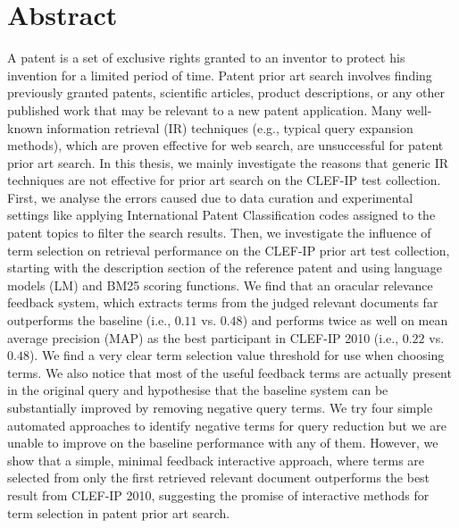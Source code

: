 \chapter*{Abstract}
\vspace{-1em}
A patent is a set of exclusive rights granted to an inventor to protect 
his invention for a limited period of time. Patent prior art search involves 
finding previously granted patents, 
scientific articles, product descriptions, or any other published work 
that may be relevant to a new patent application.
Many well-known information retrieval (IR) techniques (e.g., typical query expansion methods), which are proven effective 
for web search, are unsuccessful for patent 
prior art search.
In this thesis, we mainly investigate the reasons that generic IR techniques are not 
effective for prior art search on the CLEF-IP test collection.   
First, we analyse the errors caused due to data curation and experimental settings 
like applying International Patent Classification codes assigned to the patent topics 
to filter the search results.  
Then, we investigate the influence of term selection on retrieval
performance on the CLEF-IP prior art test collection, starting with
the description section of the reference patent and using language models (LM) and BM25
scoring functions. We find that an oracular relevance feedback system,
which extracts terms from the judged relevant documents far
outperforms the baseline (i.e., $0.11$ vs. $ 0.48 $) and performs twice as well on mean average precision (MAP) as the best
participant in CLEF-IP 2010 (i.e., $0.22$ vs. $ 0.48 $). We find a very clear term selection value
threshold for use when choosing terms.  We also notice that most of
the useful feedback terms are actually present in the original query
and hypothesise that the baseline system can be substantially
improved by removing negative query terms.
We try four simple automated approaches to identify negative terms
for query reduction but we are unable to improve on the baseline
performance with any of them. However, we show that a
simple, minimal feedback interactive approach, where terms are selected
from only the first retrieved relevant document outperforms the best
result from CLEF-IP 2010, suggesting the promise of interactive methods
for term selection in patent prior art search.

